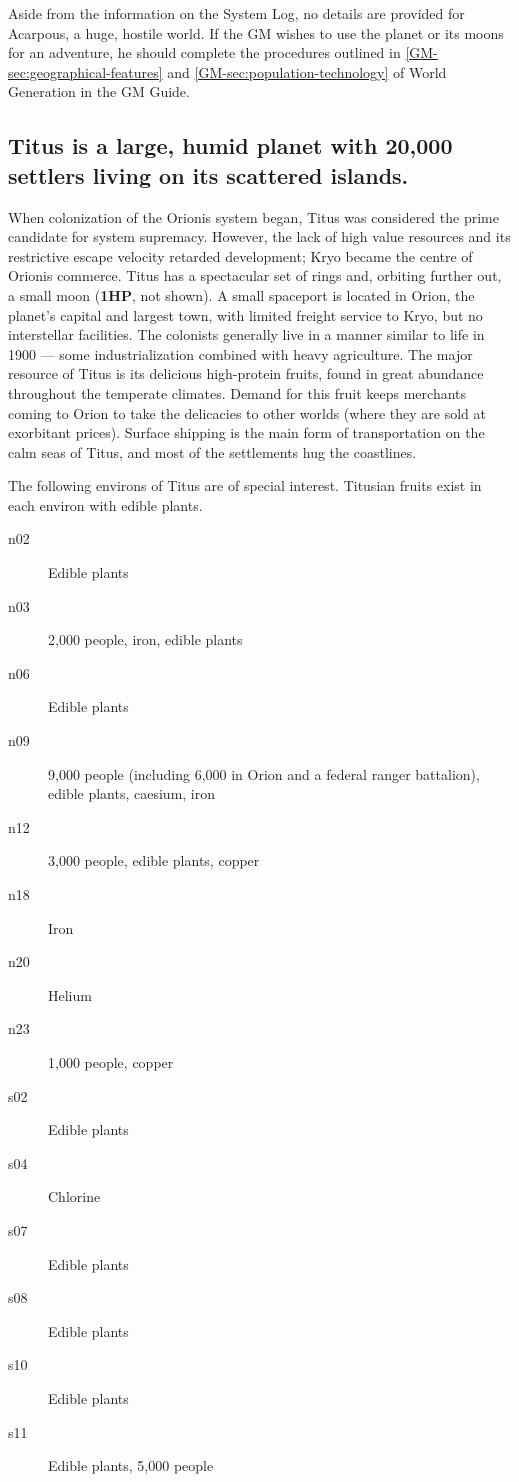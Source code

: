 Aside from the information on the System Log, no details are provided
for Acarpous, a huge, hostile world. If the GM wishes to use the
planet or its moons for an adventure, he should complete the
procedures outlined in \ref{GM-sec:geographical-features} and
\ref{GM-sec:population-technology} of World Generation in the GM
Guide.


\subsection[Titus]{Titus is a large, humid planet with 20,000 settlers
  living 
  on its scattered islands.}
\label{sec:titus-large-humid}

When colonization of the Orionis system began, Titus was considered
the prime candidate for system supremacy. However, the lack of high
value resources and its restrictive escape velocity retarded
development; Kryo became the centre of Orionis commerce. Titus has a
spectacular set of rings and, orbiting further out, a small moon
(\textbf{1HP}, not shown). A small spaceport is located in Orion, the
planet's capital and largest town, with limited freight service to
Kryo, but no interstellar facilities. The colonists generally live in
a manner similar to life in 1900 --- some industrialization combined
with heavy agriculture. The major resource of Titus is its delicious
high-protein fruits, found in great abundance throughout the temperate
climates.  Demand for this fruit keeps merchants coming to Orion to
take the delicacies to other worlds (where they are sold at exorbitant
prices).  Surface shipping is the main form of transportation on the
calm seas of Titus, and most of the settlements hug the coastlines.

The following environs of Titus are of special interest. Titusian
fruits exist in each environ with edible plants.

\begin{description}
\item[n02] Edible plants
\item[n03] 2,000 people, iron, edible plants
\item[n06] Edible plants
\item[n09] 9,000 people (including 6,000 in Orion and a federal ranger
  battalion), edible plants, caesium, iron
\item[n12] 3,000 people, edible plants, copper
\item[n18] Iron
\item[n20] Helium
\item[n23] 1,000 people, copper
\item[s02] Edible plants
\item[s04] Chlorine
\item[s07] Edible plants
\item[s08] Edible plants
\item[s10] Edible plants
\item[s11] Edible plants, 5,000 people
\end{description}


